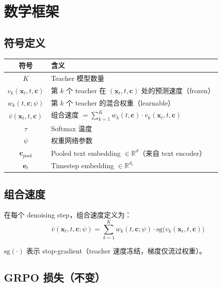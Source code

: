 \documentclass[11pt,a4paper]{article}
\newcommand{\R}{\mathbb{R}}
\newcommand{\detach}{\mathrm{sg}}
\theoremstyle{definition}
\begin{document}
\section{数学框架}

\subsection{符号定义}

\begin{center}
\begin{tabular}{cl}
\toprule
\textbf{符号} & \textbf{含义} \\
\midrule
$K$ & Teacher 模型数量 \\
$v_k(\mathbf{x}_t, t, \mathbf{c})$ & 第 $k$ 个 teacher 在 $(\mathbf{x}_t, t, \mathbf{c})$ 处的预测速度（frozen） \\
$w_k(t, \mathbf{c}; \psi)$ & 第 $k$ 个 teacher 的混合权重（learnable） \\
$\bar{v}(\mathbf{x}_t, t, \mathbf{c})$ & 组合速度 $= \sum_{k=1}^K w_k(t,\mathbf{c}) \cdot v_k(\mathbf{x}_t, t, \mathbf{c})$ \\
$\tau$ & Softmax 温度 \\
$\psi$ & 权重网络参数 \\
$\mathbf{c}_{\text{pool}}$ & Pooled text embedding $\in \R^{d}$（来自 text encoder） \\
$\mathbf{e}_t$ & Timestep embedding $\in \R^{d_t}$ \\
\bottomrule
\end{tabular}
\end{center}

\subsection{组合速度}

在每个 denoising step，组合速度定义为：
\begin{equation}
\bar{v}(\mathbf{x}_t, t, \mathbf{c}; \psi) = \sum_{k=1}^K w_k(t, \mathbf{c}; \psi) \cdot \detach\bigl(v_k(\mathbf{x}_t, t, \mathbf{c})\bigr)
\end{equation}

$\detach(\cdot)$ 表示 stop-gradient（teacher 速度冻结，梯度仅流过权重）。

\subsection{GRPO 损失（不变）}
\end{document}
